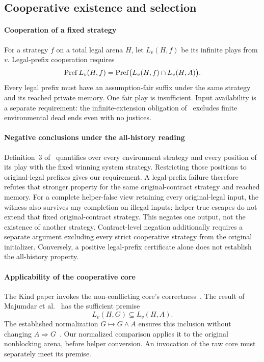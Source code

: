 \subsection{Cooperative existence and selection}\label{sec:cooperation}
\paragraph{Cooperation of a fixed strategy}
For a strategy $f$ on a total legal arena $H$, let $L_v(H,f)$ be its infinite plays from $v$. Legal-prefix cooperation requires
\begin{equation}
\operatorname{Pref} L_v(H,f)=
\operatorname{Pref}\bigl(L_v(H,f)\cap L_v(H,A)\bigr).
\label{eq:nonconflict}
\end{equation}
Every legal prefix must have an assumption-fair suffix under the same strategy and its reached private memory. One fair play is insufficient. Input availability is a separate requirement: the infinite-extension obligation of~\cite[Definition~3]{kind} excludes finite environmental dead ends even with no justices.

\paragraph{Negative conclusions under the all-history reading}
Definition~3 of~\cite{kind} quantifies over every environment strategy
and every position of its play with the fixed winning system strategy.
Restricting those positions to original-legal prefixes gives our
requirement. A legal-prefix failure therefore refutes that stronger
property for the same original-contract strategy and reached memory.
For a complete helper-false view retaining every original-legal input,
the witness also survives any completion on illegal inputs; helper-true
escapes do not extend that fixed original-contract strategy.
This negates one output, not the existence of another strategy.
Contract-level negation additionally requires a separate argument
excluding every strict cooperative strategy from the original
initializer. Conversely, a positive legal-prefix certificate alone
does not establish the all-history property.

\paragraph{Applicability of the cooperative core}
The Kind paper invokes the non-conflicting core's correctness~\cite[Theorem~3 and Appendix~A]{kind}.
The result of Majumdar et al.~\cite{friendly} has the sufficient premise
\begin{equation}
L_v(H,G)\subseteq L_v(H,A).
\label{eq:premise}
\end{equation}
The established normalization $G\mapsto G\land A$ ensures this inclusion without changing $A\Rightarrow G$~\cite{friendly}. Our normalized comparison applies it to the original nonblocking arena, before helper conversion. An invocation of the raw core must separately meet its premise.

